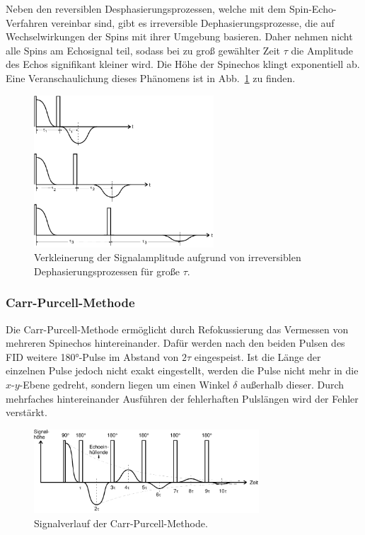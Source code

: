 Neben den reversiblen Desphasierungsprozessen, welche mit dem Spin-Echo-Verfahren
vereinbar sind, gibt es irreversible Dephasierungsprozesse, die auf Wechselwirkungen
der Spins mit ihrer Umgebung basieren.
Daher nehmen nicht alle Spins am Echosignal teil, sodass bei zu groß gewählter Zeit $\tau$
die Amplitude des Echos signifikant kleiner wird.
Die Höhe der Spinechos klingt exponentiell ab.
Eine Veranschaulichung dieses Phänomens ist in Abb.~\ref{fig:dephase}
zu finden.
\begin{figure}[h]
  \centering
  \includegraphics[width = 0.6\textwidth]{Pics/echo.pdf}
  \caption{Verkleinerung der Signalamplitude aufgrund von irreversiblen Dephasierungsprozessen
  für große $\tau$\cite{anleitung}.}
  \label{fig:dephase}
\end{figure}

\subsubsection{Carr-Purcell-Methode}
\vspace{-10pt}
Die Carr-Purcell-Methode ermöglicht durch Refokussierung das Vermessen von mehreren Spinechos
hintereinander. Dafür werden nach den beiden Pulsen des FID weitere 180°-Pulse
im Abstand von $2\tau$ eingespeist. Ist die Länge der einzelnen Pulse jedoch nicht
exakt eingestellt, werden die Pulse nicht mehr in die $x$-$y$-Ebene gedreht, sondern
liegen um einen Winkel $\delta$ außerhalb dieser.
Durch mehrfaches hintereinander Ausführen der fehlerhaften Pulslängen wird
der Fehler verstärkt.
\begin{figure}
  \centering
  \includegraphics[width = 0.75\textwidth]{Pics/carr_purcell.pdf}
  \caption{Signalverlauf der Carr-Purcell-Methode\cite{anleitung}.}
  \label{eqn:carr_purcell}
\end{figure}
\vspace{-10pt}
